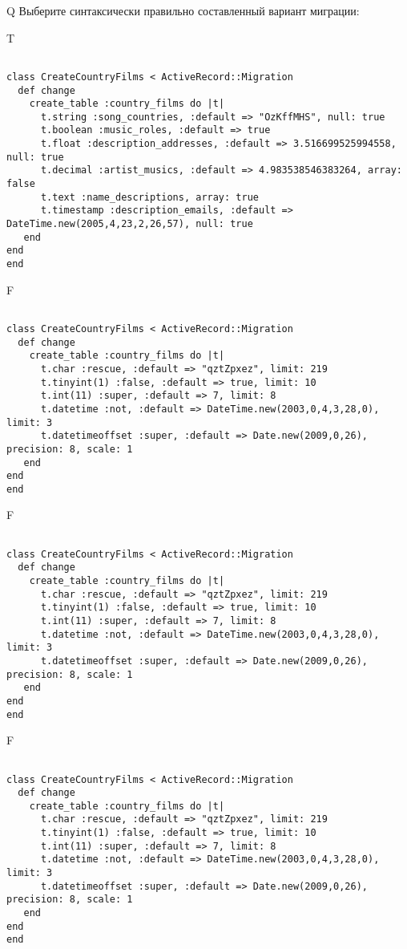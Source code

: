 Q
Выберите синтаксически правильно составленный вариант миграции:

T
\begin{verbatim}
		
class CreateCountryFilms < ActiveRecord::Migration 
  def change 
    create_table :country_films do |t| 
      t.string :song_countries, :default => "OzKffMHS", null: true
      t.boolean :music_roles, :default => true
      t.float :description_addresses, :default => 3.516699525994558, null: true
      t.decimal :artist_musics, :default => 4.983538546383264, array: false
      t.text :name_descriptions, array: true
      t.timestamp :description_emails, :default => DateTime.new(2005,4,23,2,26,57), null: true
   end
end
end
\end{verbatim}

F
\begin{verbatim}
		
class CreateCountryFilms < ActiveRecord::Migration 
  def change 
    create_table :country_films do |t| 
      t.char :rescue, :default => "qztZpxez", limit: 219
      t.tinyint(1) :false, :default => true, limit: 10
      t.int(11) :super, :default => 7, limit: 8
      t.datetime :not, :default => DateTime.new(2003,0,4,3,28,0), limit: 3
      t.datetimeoffset :super, :default => Date.new(2009,0,26), precision: 8, scale: 1
   end
end
end
\end{verbatim}

F
\begin{verbatim}
		
class CreateCountryFilms < ActiveRecord::Migration 
  def change 
    create_table :country_films do |t| 
      t.char :rescue, :default => "qztZpxez", limit: 219
      t.tinyint(1) :false, :default => true, limit: 10
      t.int(11) :super, :default => 7, limit: 8
      t.datetime :not, :default => DateTime.new(2003,0,4,3,28,0), limit: 3
      t.datetimeoffset :super, :default => Date.new(2009,0,26), precision: 8, scale: 1
   end
end
end
\end{verbatim}

F
\begin{verbatim}
		
class CreateCountryFilms < ActiveRecord::Migration 
  def change 
    create_table :country_films do |t| 
      t.char :rescue, :default => "qztZpxez", limit: 219
      t.tinyint(1) :false, :default => true, limit: 10
      t.int(11) :super, :default => 7, limit: 8
      t.datetime :not, :default => DateTime.new(2003,0,4,3,28,0), limit: 3
      t.datetimeoffset :super, :default => Date.new(2009,0,26), precision: 8, scale: 1
   end
end
end
\end{verbatim}

